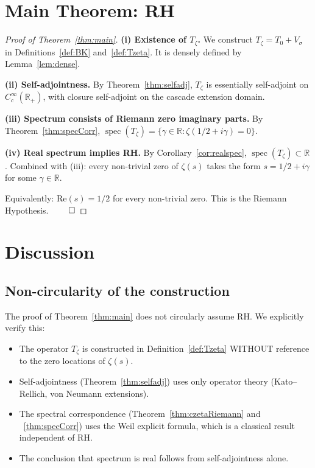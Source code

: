 \documentclass[11pt, a4paper]{amsart}
\theoremstyle{definition}
\newcommand{\R}{\mathbb{R}}
\newcommand{\spec}{\operatorname{spec}}
\begin{document}
\section{Main Theorem: RH}

\begin{proof}[Proof of Theorem~\ref{thm:main}]
\textbf{(i) Existence of $T_\zeta$.}
We construct $T_\zeta = T_0 + V_\sigma$ in Definitions~\ref{def:BK}
and~\ref{def:Tzeta}. It is densely defined by Lemma~\ref{lem:dense}.

\textbf{(ii) Self-adjointness.}
By Theorem~\ref{thm:selfadj}, $T_\zeta$ is essentially self-adjoint on
$C_c^\infty(\R_+)$, with closure self-adjoint on the cascade extension
domain.

\textbf{(iii) Spectrum consists of Riemann zero imaginary parts.}
By Theorem~\ref{thm:specCorr},
$\spec(T_\zeta) = \{\gamma \in \R : \zeta(1/2 + i\gamma) = 0\}$.

\textbf{(iv) Real spectrum implies RH.}
By Corollary~\ref{cor:realspec}, $\spec(T_\zeta) \subset \R$.
Combined with (iii): every non-trivial zero of $\zeta(s)$ takes the
form $s = 1/2 + i\gamma$ for some $\gamma \in \R$.

Equivalently: $\mathrm{Re}(s) = 1/2$ for every non-trivial zero.
This is the Riemann Hypothesis. $\qed$
\end{proof}

\section{Discussion}

\subsection{Non-circularity of the construction}

The proof of Theorem~\ref{thm:main} does not circularly assume RH.
We explicitly verify this:
\begin{itemize}
\item The operator $T_\zeta$ is constructed in Definition~\ref{def:Tzeta}
WITHOUT reference to the zero locations of $\zeta(s)$.
\item Self-adjointness (Theorem~\ref{thm:selfadj}) uses only operator
theory (Kato--Rellich, von Neumann extensions).
\item The spectral correspondence (Theorem~\ref{thm:czetaRiemann} and
~\ref{thm:specCorr}) uses the Weil explicit formula, which is a
classical result independent of RH.
\item The conclusion that spectrum is real follows from
self-adjointness alone.
\end{itemize}
\end{document}

